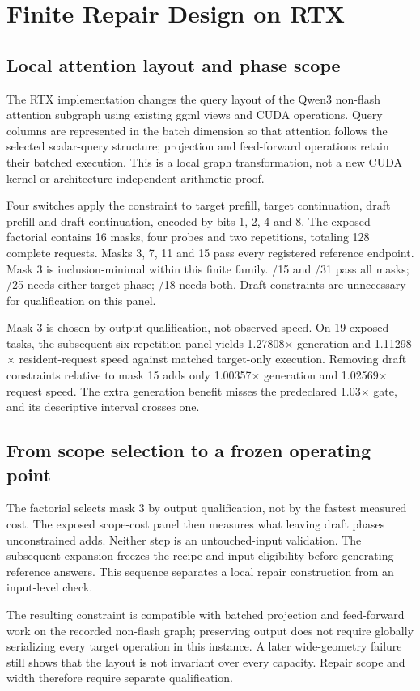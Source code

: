 \section{Finite Repair Design on RTX}
\label{sec:repair}
\subsection{Local attention layout and phase scope}

The RTX implementation changes the query layout of the Qwen3 non-flash attention subgraph using existing ggml views and CUDA operations. Query columns are represented in the batch dimension so that attention follows the selected scalar-query structure; projection and feed-forward operations retain their batched execution. This is a local graph transformation, not a new CUDA kernel or architecture-independent arithmetic proof.

Four switches apply the constraint to target prefill, target continuation, draft prefill and draft continuation, encoded by bits 1, 2, 4 and 8. The exposed factorial contains 16 masks, four probes and two repetitions, totaling 128 complete requests. Masks 3, 7, 11 and 15 pass every registered reference endpoint. Mask 3 is inclusion-minimal within this finite family. /15 and /31 pass all masks; /25 needs either target phase; /18 needs both. Draft constraints are unnecessary for qualification on this panel. 

Mask 3 is chosen by output qualification, not observed speed. On 19 exposed tasks, the subsequent six-repetition panel yields 1.27808$\times$ generation and 1.11298$\times$ resident-request speed against matched target-only execution. Removing draft constraints relative to mask 15 adds only 1.00357$\times$ generation and 1.02569$\times$ request speed. The extra generation benefit misses the predeclared 1.03$\times$ gate, and its descriptive interval crosses one. 


\subsection{From scope selection to a frozen operating point}
The factorial selects mask 3 by output qualification, not by the fastest measured cost. The exposed scope-cost panel then measures what leaving draft phases unconstrained adds. Neither step is an untouched-input validation. The subsequent expansion freezes the recipe and input eligibility before generating reference answers. This sequence separates a local repair construction from an input-level check.

The resulting constraint is compatible with batched projection and feed-forward work on the recorded non-flash graph; preserving output does not require globally serializing every target operation in this instance. A later wide-geometry failure still shows that the layout is not invariant over every capacity. Repair scope and width therefore require separate qualification.
